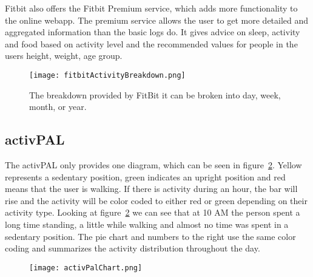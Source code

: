 Fitbit also offers the Fitbit Premium service, which adds more functionality to the online webapp. The premium service allows the user to get more detailed and aggregated information than the basic logs do. It gives advice on sleep, activity and food based on activity level and the recommended values for people in the users height, weight, age group.

\begin{figure}[h!]
	\centering
		\texttt{[image: fitbitActivityBreakdown.png]}
		\caption{\footnotesize The breakdown provided by FitBit it can be broken into day, week, month, or year.}
		\label{fig:fitbitActivityBreakdown}
\end{figure}

\subsection{activPAL}
\label{sec:activPALViz}
The activPAL only provides one diagram, which can be seen in figure~\ref{fig:activPalActivityBreakdown}. Yellow represents a sedentary position, green indicates an upright position and red means that the user is walking. If there is activity during an hour, the bar will rise and the activity will be color coded to either red or green depending on their activity type. Looking at figure~\ref{fig:activPalActivityBreakdown} we can see that at 10 AM the person spent a long time standing, a little while walking and almost no time was spent in a sedentary position. The pie chart and numbers to the right use the same color coding and summarizes the activity distribution throughout the day.

\begin{figure}[h!]
	\centering
		\texttt{[image: activPalChart.png]}
		\caption{\footnotesize }
		\label{fig:activPalActivityBreakdown}
\end{figure}
